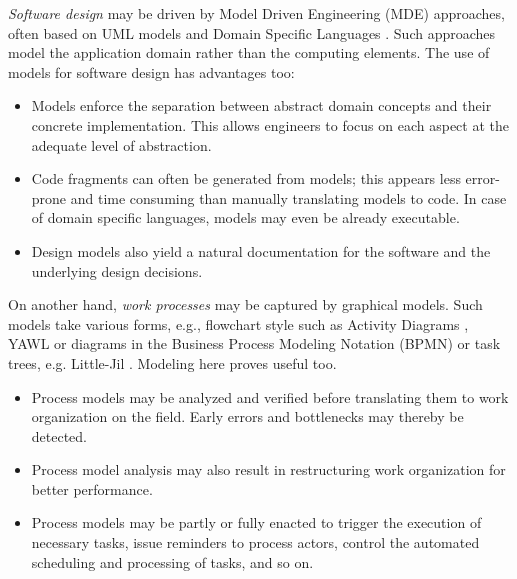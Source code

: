 \emph{Software design} may be driven by Model Driven Engineering (MDE) approaches, often based on UML models \cite{OMG:2004} and Domain Specific Languages \cite{VanDeursen:2000, Fowler:2010}. Such approaches model the application domain rather than the computing elements. The use of models for software design has advantages too:
\begin{itemize}
\item Models enforce the separation between abstract domain concepts and their concrete implementation. This allows engineers to focus on each aspect at the adequate level of abstraction.
\item Code fragments can often be generated from models; this appears less error-prone and time consuming than manually translating models to code. In case of domain specific languages, models may even be already executable. 
\item Design models also yield a natural documentation for the software and the underlying design decisions. 
\end{itemize}


On another hand, \emph{work processes} may be captured by graphical models. Such models take various forms, e.g., flowchart style such as Activity Diagrams \cite{OMG:2004}, YAWL \cite{Vanderaalst:2005} or diagrams in the Business Process Modeling Notation (BPMN) \cite{OMG:2008} or task trees, e.g. Little-Jil \cite{Clarke:2008}. Modeling here proves useful too.
\begin{itemize}
\item Process models may be analyzed and verified before translating them to work organization on the field. Early errors and bottlenecks may thereby be detected.
\item Process model analysis may also result in restructuring work organization for better performance.
\item Process models may be partly or fully enacted to trigger the execution of necessary tasks, issue reminders to process actors, control the automated scheduling and processing of tasks, and so on.
\end{itemize}
